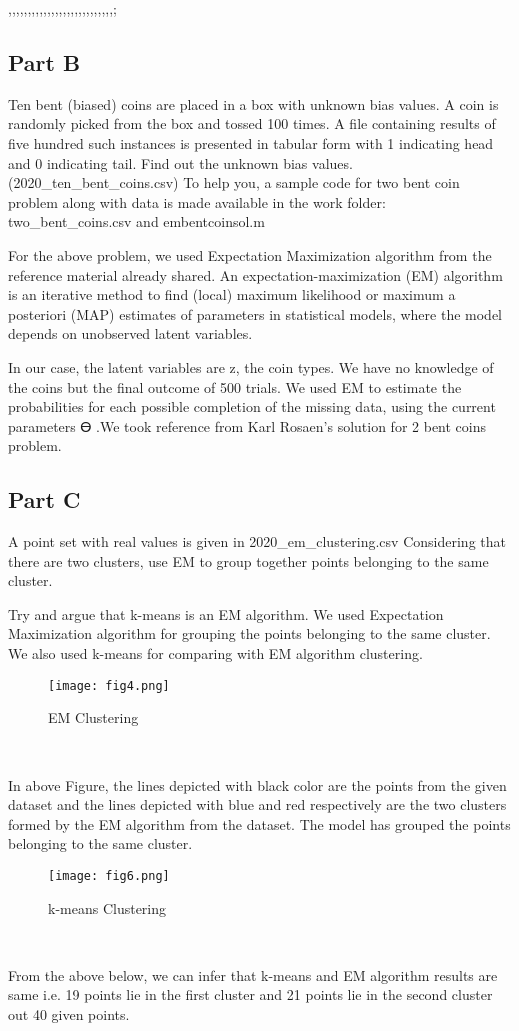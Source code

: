 ,,,,,,,,,,,,,,,,,,,,,,,,,,,;\documentclass[conference]{IEEEtran}
\begin{document}
\subsection{Part B}
 Ten bent (biased) coins are placed in a box with unknown
bias values. A coin is randomly picked from the box and
tossed 100 times. A file containing results of five hundred
such instances is presented in tabular form with 1 indicating
head and 0 indicating tail. Find out the unknown bias values.
{(2020\_ten\_bent\_coins.csv)} To help you, a sample code for two
bent coin problem along with data is made available in the
work folder: {two_bent_coins.csv} and {embentcoinsol.m}
\\
\par For the above problem, we used Expectation Maximization
algorithm from the reference material\cite{b11} already shared.
An expectation-maximization (EM) algorithm is an iterative
method to find (local) maximum likelihood or maximum a
posteriori (MAP) estimates of parameters in statistical models,
where the model depends on unobserved latent variables\cite{b12}.
\par In our case, the latent variables are z, the coin types. We have
no knowledge of the coins but the final outcome of 500 trials.
We used EM to estimate the probabilities for each possible
completion of the missing data, using the current parameters
Ꮎ .We took reference from Karl Rosaen's solution for 2
bent coins problem\cite{b13}.
\\
\subsection{Part C}
A point set with real values is given in
{2020\_em\_clustering.csv} Considering that there are two
clusters, use EM to group together points belonging to the
same cluster. 
\par Try and argue that k-means is an EM algorithm.
We used Expectation Maximization algorithm for grouping
the points belonging to the same cluster. We also used k-means for comparing 
with EM algorithm clustering.
\\
\begin{figure}[htbp]
\centerline{\texttt{[image: fig4.png]}}
\caption{EM Clustering}
\label{fig}
\end{figure}
\\
\par In above Figure, the lines depicted with black color are the points
from the given dataset and the lines depicted with blue and red
respectively are the two clusters formed by the EM algorithm
from the dataset. The model has grouped the points belonging
to the same cluster.
\begin{figure}[htbp]
\centerline{\texttt{[image: fig6.png]}}
\caption{k-means Clustering}
\label{fig}
\end{figure}
\\
\par From the above below, we can infer that k-means and EM
algorithm results are same i.e. 19 points lie in the first cluster
and 21 points lie in the second cluster out 40 given points.
\end{document}
